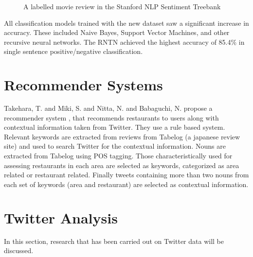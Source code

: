 \begin{figure}
    \centering
    \setlength{\fboxsep}{0pt}
    \setlength{\fboxrule}{0.01pt}
    \setlength{\belowcaptionskip}{-20pt}
    \caption{A labelled movie review in the Stanford NLP Sentiment Treebank \cite{stanfordSentiment2013}}
\end{figure}

All classification models trained with the new dataset saw a significant increase in accuracy. These included Naive Bayes, Support Vector Machines, and other recursive neural networks. The RNTN achieved the highest accuracy of 85.4\% in single sentence positive/negative classification.

\section{Recommender Systems}

Takehara, T. and Miki, S. and Nitta, N. and Babaguchi, N. propose a recommender system \cite{takeharaContext2012}, that recommends restaurants to users along with contextual information taken from Twitter. They use a rule based system. Relevant keywords are extracted from reviews from Tabelog (a japanese review site) and used to search Twitter for the contextual information. Nouns are extracted from Tabelog using POS tagging. Those characteristically used for assessing restaurants in each area are selected as keywords, categorized as area related or restaurant related. Finally tweets containing more than two nouns from each set of keywords (area and restaurant) are selected as contextual information.

\section{Twitter Analysis}

In this section, research that has been carried out on Twitter data will be discussed.